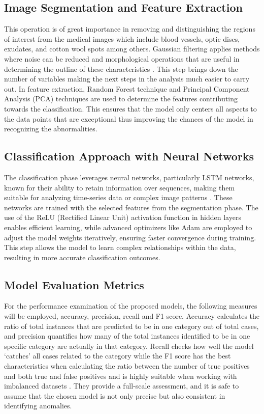 \documentclass[a4paper, 12pt]{article}
\begin{document}
\subsection{ Image Segmentation and Feature Extraction }

This operation is of great importance in removing and distinguishing the regions of interest from the medical images which include blood vessels, optic discs, exudates, and cotton wool spots among others. Gaussian filtering applies methods where noise can be reduced and morphological operations that are useful in determining the outline of these characteristics . This step brings down the number of variables making the next steps in the analysis much easier to carry out. In feature extraction, Random Forest technique and Principal Component Analysis (PCA) techniques are used to determine the features contributing towards the classification. This ensures that the model only centers all aspects to the data points that are exceptional thus improving the chances of the model in recognizing the abnormalities.

\subsection{ Classification Approach with Neural Networks }

The classification phase leverages neural networks, particularly LSTM networks, known for their ability to retain information over sequences, making them suitable for analyzing time-series data or complex image patterns . These networks are trained with the selected features from the segmentation phase. The use of the ReLU (Rectified Linear Unit) activation function in hidden layers enables efficient learning, while advanced optimizers like Adam are employed to adjust the model weights iteratively, ensuring faster convergence during training. This step allows the model to learn complex relationships within the data, resulting in more accurate classification outcomes.

\subsection{ Model Evaluation Metrics }

For the performance examination of the proposed models, the following measures will be employed, accuracy, precision, recall and F1 score. Accuracy calculates the ratio of total instances that are predicted to be in one category out of total cases, and precision quantifies how many of the total instances identified to be in one specific category are actually in that category. Recall checks how well the model ‘catches’ all cases related to the category while the F1 score has the best characteristics when calculating the ratio between the number of true positives and both true and false positives and is highly suitable when working with imbalanced datasets . They provide a full-scale assessment, and it is safe to assume that the chosen model is not only precise but also consistent in identifying anomalies.
\end{document}
